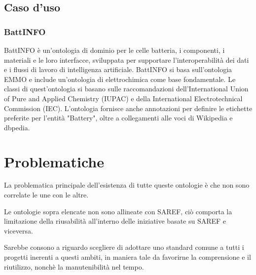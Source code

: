 \subsection{Caso d'uso}

\subsubsection{BattINFO}
BattINFO \cite{emmo} è un'ontologia di dominio per le celle batteria, i
componenti, i materiali e le loro interfacce, sviluppata per supportare
l'interoperabilità dei dati e i flussi di lavoro di intelligenza artificiale.
BattINFO si basa sull'ontologia EMMO e include un'ontologia di elettrochimica
come base fondamentale. Le classi di quest'ontologia si basano sulle
raccomandazioni
dell'International Union of Pure and Applied Chemistry (IUPAC) e della
International Electrotechnical Commission (IEC). L'ontologia fornisce anche
annotazioni per definire le etichette preferite per l'entità "Battery", oltre a
collegamenti alle voci di Wikipedia e dbpedia.

\section{Problematiche}
La problematica principale dell'esistenza di tutte queste ontologie è che non
sono correlate le une con le altre.

Le ontologie sopra elencate non sono allineate con SAREF, ciò comporta la
limitazione della riusabilità all'interno delle iniziative basate su SAREF e
viceversa.

Sarebbe consono a riguardo scegliere di adottare uno standard comune a tutti i
progetti inerenti a questi ambiti, in maniera tale da favorirne la comprensione
e il riutilizzo, nonchè la manutenibilità nel tempo.